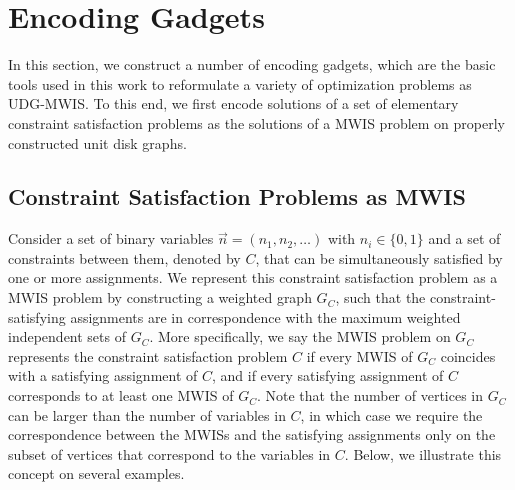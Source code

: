 

\section{Encoding Gadgets}
\label{sec:encoding}

In this section, we construct a number of encoding gadgets, which are the basic tools used in this work to reformulate a variety of optimization problems as UDG-MWIS. To this end, we first encode solutions of a set of elementary constraint satisfaction problems as the solutions of a MWIS problem on properly constructed unit disk graphs.

\subsection{Constraint Satisfaction Problems as MWIS}\label{sec:CSFMWIS}

Consider a set of binary variables $\vec{n} = (n_1, n_2, \dots)$ with $n_i\in\{0,1\}$ and a set of constraints between them, denoted by $C$, that can be simultaneously satisfied by one or more  assignments. We represent this constraint satisfaction problem as a MWIS problem by constructing a weighted graph $G_C$, such that the constraint-satisfying assignments are in correspondence with the maximum weighted independent sets of $G_C$. More specifically, we say the MWIS problem on $G_C$ represents the constraint satisfaction problem $C$ if every MWIS of $G_C$ coincides with a satisfying assignment of $C$, and if every satisfying assignment of $C$ corresponds to at least one MWIS of $G_C$. Note that the number of vertices in $G_C$ can be larger than the number of variables in $C$, in which case we require the correspondence between the MWISs and the satisfying assignments only on the subset of vertices that correspond to the variables in $C$. Below, we illustrate this concept on several examples.

